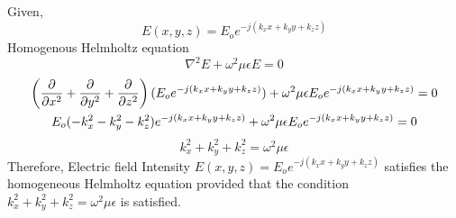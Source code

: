 \documentclass[a4paper]{article}
\begin{document}
    \begin{answer}[Question 3]
        Given,
        \[
            {E}(x,y,z) = E_{o} e^{-j (k_{x} x+k_{y} y+k_{z} z)}
        \]
        Homogenous Helmholtz equation 
        \begin{equation}
            \boxed{\nabla^2 {E} + \omega^2 \mu \epsilon {E} = 0}
        \end{equation}
        \begin{gather*}
            \left(\pdv{}{x^2}+\pdv{}{y^2}+\pdv{}{z^2}\right)(E_o e^{-j (k_{x} x+k_{y} y+k_{z} z)}) + \omega^2 \mu \epsilon {E_o}e^{-j (k_{x} x+k_{y} y+k_{z} z)} = 0\\
            E_o(-k_{x}^2 -k_{y} ^2 -k_{z} ^2 )e^{-j (k_{x} x+k_{y} y+k_{z} z)} + \omega^2 \mu \epsilon {E_o}e^{-j (k_{x} x+k_{y} y+k_{z} z)} = 0\\ 
        \end{gather*}
        \begin{equation}
            \boxed{k_{x} ^2 + k_{y} ^2 + k_{z} ^2 = \omega ^2 \mu \epsilon }
        \end{equation}
        Therefore, Electric field Intensity \({E}(x,y,z) = E_{o} e^{-j (k_{x} x+k_{y} y+k_{z} z)}\)  satisfies the homogeneous Helmholtz equation provided that the condition \(k_{x} ^2 + k_{y} ^2 + k_{z} ^2 = \omega ^2 \mu \epsilon\) is satisfied. 
    \end{answer}
\end{document}
